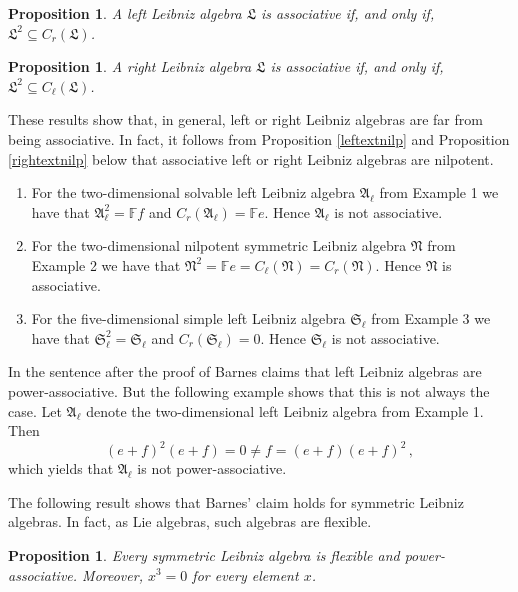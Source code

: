 \documentclass{amsart}
\newtheorem{pro}[thm]{Proposition}
\numberwithin{equation}{section}
\newcommand{\F}{\mathbb{F}}
\newcommand{\af}{\mathfrak{A}}
\newcommand{\Sf}{\mathfrak{S}}
\newcommand{\lf}{\mathfrak{L}}
\newcommand{\nf}{\mathfrak{N}}
\begin{document}
\begin{pro}\label{leftass}
A left Leibniz algebra $\lf$ is associative if, and only if, $\lf^2\subseteq C_r(\lf)$.
\end{pro}

\begin{pro}\label{rightass}
A right Leibniz algebra $\lf$ is associative if, and only if, $\lf^2\subseteq C_\ell(\lf)$.
\end{pro}

These results show that, in general, left or right Leibniz algebras are far from being associative.
In fact, it follows from Proposition \ref{leftextnilp} and Proposition \ref{rightextnilp} below that
associative left or right Leibniz algebras are nilpotent.
\vspace{.2cm}

\begin{enumerate}
\item[(1)] For the two-dimensional solvable left Leibniz algebra $\af_\ell$ from Example 1 we have
                that $\af_\ell^2=\F f$ and $C_r(\af_\ell)=\F e$. Hence $\af_\ell$ is not associative.
\item[(2)] For the two-dimensional nilpotent symmetric Leibniz algebra $\nf$ from Example 2 we
                have that $\nf^2=\F e=C_\ell(\nf)=C_r(\nf)$. Hence $\nf$ is associative.
\item[(3)] For the five-dimensional simple left Leibniz algebra $\Sf_\ell$ from Example 3 we have
                that $\Sf_\ell^2=\Sf_\ell$ and $C_r(\Sf_\ell)=0$. Hence $\Sf_\ell$ is not associative.
\end{enumerate}
\vspace{.2cm}

In the sentence after the proof of \cite[Corollary 1.3]{B1} Barnes claims that left Leibniz
algebras are power-associative. But the following example shows that this is not always
the case. Let $\af_\ell$ denote the two-dimensional left Leibniz algebra from Example 1.
Then $$(e+f)^2(e+f)=0\ne f=(e+f)(e+f)^2\,,$$ which yields that $\af_\ell$ is not
power-associative.

The following result shows that Barnes' claim holds for symmetric Leibniz algebras. In fact,
as Lie algebras, such algebras are flexible.

\begin{pro}\label{flexible}
Every symmetric Leibniz algebra is flexible and power-associative. Moreover, $x^3=0$ for
every element $x$.
\end{pro}
\end{document}
